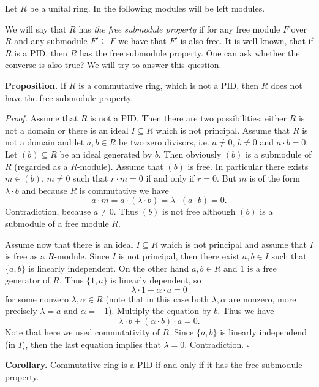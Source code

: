 \documentclass[12pt]{article}
\begin{document}
Let $R$ be a unital ring. In the following modules will be left modules.

We will say that $R$ has \textit{the free submodule property} if for any free module $F$ over $R$ and any submodule $F'\subseteq F$ we have that $F'$ is also free. It is well known, that if $R$ is a PID, then $R$ has the free submodule property. One can ask whether the converse is also true? We will try to answer this question.

\textbf{Proposition.} If $R$ is a commutative ring, which is not a PID, then $R$ does not have the free submodule property.

\textit{Proof.} Assume that $R$ is not a PID. Then there are two possibilities: either $R$ is not a domain or there is an ideal $I\subseteq R$ which is not principal. Assume that $R$ is not a domain and let $a,b\in R$ be two zero divisors, i.e. $a\neq 0$, $b\neq 0$ and $a\cdot b=0$. Let $(b)\subseteq R$ be an ideal generated by $b$. Then obviously $(b)$ is a submodule of $R$ (regarded as a $R$-module). Assume that $(b)$ is free. In particular there exists $m \in (b)$, $m\neq 0$ such that $r\cdot m=0$ if and only if $r=0$. But $m$ is of the form $\lambda\cdot b$ and because $R$ is commutative we have
$$a\cdot m=a\cdot (\lambda\cdot b)=\lambda\cdot (a\cdot b)=0.$$
Contradiction, because $a\neq 0$. Thus $(b)$ is not free although $(b)$ is a submodule of a free module $R$.

Assume now that there is an ideal $I\subseteq R$ which is not principal and assume that $I$ is free as a $R$-module. Since $I$ is not principal, then there exist $a,b\in I$ such that $\{a,b\}$ is linearly independent. On the other hand $a,b\in R$ and $1$ is a free generator of $R$. Thus $\{1,a\}$ is linearly dependent, so
$$\lambda\cdot 1+ \alpha\cdot a=0$$
for some nonzero $\lambda, \alpha\in R$ (note that in this case both $\lambda,\alpha$ are nonzero, more precisely $\lambda=a$ and $\alpha=-1$). Multiply the equation by $b$. Thus we have
$$\lambda\cdot b + (\alpha\cdot b)\cdot a=0.$$
Note that here we used commutativity of $R$. Since $\{a,b\}$ is linearly independend (in $I$), then the last equation implies that $\lambda=0$. Contradiction. $\square$

\textbf{Corollary.} Commutative ring is a PID if and only if it has the free submodule property.
\end{document}
